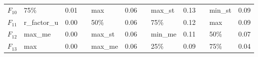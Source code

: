 \begin{table}[]
\begin{tabular}{|l|l|l|l|l|l|l|l|l|lll}
$F_{10}$                                       & 75\%                                                             & 0.01                                                                &                                         & max                                                              & 0.06                                                                &                                         & max\_st                                                          & 0.13                                                                & \multicolumn{1}{l|}{}                   & \multicolumn{1}{l|}{min\_st}                                     & \multicolumn{1}{l|}{0.09}                                           \\ \cline{1-3} \cline{5-6} \cline{8-9} \cline{11-12} 
$F_{11}$                                       & r\_factor\_u                                                     & 0.00                                                                &                                         & 50\%                                                             & 0.06                                                                &                                         & 75\%                                                             & 0.12                                                                & \multicolumn{1}{l|}{}                   & \multicolumn{1}{l|}{max}                                         & \multicolumn{1}{l|}{0.09}                                           \\ \cline{1-3} \cline{5-6} \cline{8-9} \cline{11-12} 
$F_{12}$                                       & max\_me                                                          & 0.00                                                                &                                         & max\_st                                                          & 0.06                                                                &                                         & min\_me                                                          & 0.11                                                                & \multicolumn{1}{l|}{}                   & \multicolumn{1}{l|}{50\%}                                        & \multicolumn{1}{l|}{0.07}                                           \\ \cline{1-3} \cline{5-6} \cline{8-9} \cline{11-12} 
$F_{13}$                                       & max                                                              & 0.00                                                                &                                         & max\_me                                                          & 0.06                                                                &                                         & 25\%                                                             & 0.09                                                                & \multicolumn{1}{l|}{}                   & \multicolumn{1}{l|}{75\%}                                        & \multicolumn{1}{l|}{0.04}                                           \\ \cline{1-3} \cline{5-6} \cline{8-9} \cline{11-12} 

\end{tabular}
\end{table}
